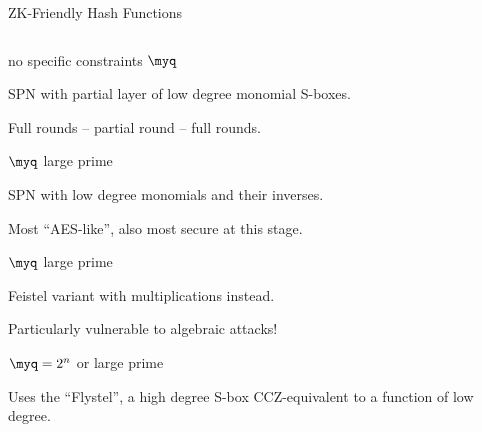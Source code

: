 \documentclass[presentation,aspectratio=1610]{beamer}
\begin{document}
\begin{frame}{ZK-Friendly Hash Functions}
  
  \begin{columns}
    \begin{column}{0.6\textwidth}
      \begin{description}
        \setlength\itemsep{0.1cm}
      \item<1->[Poseidon] \cite{EC:GLRRS20} no specific constraints $\myq$ 

        {\small SPN with partial layer of low degree monomial S-boxes.

          Full rounds -- partial round -- full rounds.}
        
      \item<2->[Rescue] \cite{ToSC:AABDS20} $\myq$ large prime

        {\small SPN with low degree monomials and their inverses.

          Most ``AES-like'', also most secure at this stage.}
        
      \item<3->[Griffin] \cite{C:GHRSWW23} $\myq$ large prime

        {\small Feistel variant with multiplications instead.

          \alert{Particularly vulnerable to algebraic attacks!}}

      \item<4->[Anemoi] \cite{C:BBCPSV23}$\myq = 2^n$ or large prime

        {\small Uses the ``Flystel'', a high degree S-box
          \alert{CCZ-equivalent} to a function of low degree.}
      \end{description}
    \end{column}
    \hfill
    \begin{column}{0.37\textwidth}
    \end{column}
  \end{columns}
\end{frame}
\end{document}

